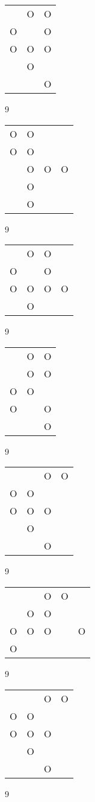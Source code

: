 \begin{tabular}{|m{0.2cm}m{0.2cm}m{0.2cm}|}\hline
 &O&O\\
O& &O\\
O&O&O\\
 &O& \\
 & &O\\
\hline\end{tabular}9
\begin{tabular}{|m{0.2cm}m{0.2cm}m{0.2cm}m{0.2cm}|}\hline
O&O& & \\
O&O& & \\
 &O&O&O\\
 &O& & \\
 &O& & \\
\hline\end{tabular}9
\begin{tabular}{|m{0.2cm}m{0.2cm}m{0.2cm}m{0.2cm}|}\hline
 &O&O& \\
O& &O& \\
O&O&O&O\\
 &O& & \\
\hline\end{tabular}9
\begin{tabular}{|m{0.2cm}m{0.2cm}m{0.2cm}|}\hline
 &O&O\\
 &O&O\\
O&O& \\
O& &O\\
 & &O\\
\hline\end{tabular}9
\begin{tabular}{|m{0.2cm}m{0.2cm}m{0.2cm}m{0.2cm}|}\hline
 & &O&O\\
O&O& & \\
O&O&O& \\
 &O& & \\
 & &O& \\
\hline\end{tabular}9
\begin{tabular}{|m{0.2cm}m{0.2cm}m{0.2cm}m{0.2cm}m{0.2cm}|}\hline
 & &O&O& \\
 &O&O& & \\
O&O&O& &O\\
O& & & & \\
\hline\end{tabular}9
\begin{tabular}{|m{0.2cm}m{0.2cm}m{0.2cm}m{0.2cm}|}\hline
 & &O&O\\
O&O& & \\
O&O&O& \\
 &O& & \\
 & &O& \\
\hline\end{tabular}9
